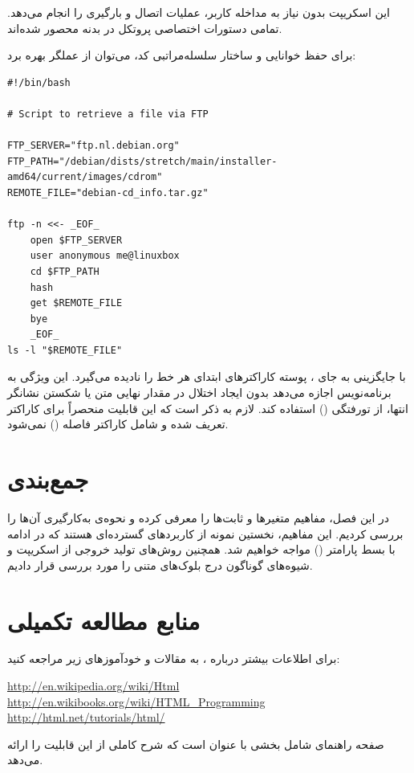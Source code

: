 این اسکریپت بدون نیاز به مداخله کاربر، عملیات اتصال و بارگیری را انجام می‌دهد. تمامی دستورات اختصاصی پروتکل  در بدنه  محصور شده‌اند.

برای حفظ خوانایی و ساختار سلسله‌مراتبی کد، می‌توان از عملگر \cmd{<<-} بهره برد:

\begin{latin}
\begin{lstlisting}
#!/bin/bash

# Script to retrieve a file via FTP

FTP_SERVER="ftp.nl.debian.org"
FTP_PATH="/debian/dists/stretch/main/installer-amd64/current/images/cdrom"
REMOTE_FILE="debian-cd_info.tar.gz"

ftp -n <<- _EOF_
    open $FTP_SERVER
    user anonymous me@linuxbox
    cd $FTP_PATH
    hash
    get $REMOTE_FILE
    bye
    _EOF_
ls -l "$REMOTE_FILE"
\end{lstlisting}
\end{latin}

با جایگزینی \cmd{<<-} به جای \cmd{<<}، پوسته کاراکترهای  ابتدای هر خط را نادیده می‌گیرد. این ویژگی به برنامه‌نویس اجازه می‌دهد بدون ایجاد اختلال در مقدار نهایی متن یا شکستن نشانگر انتها، از تورفتگی () استفاده کند. لازم به ذکر است که این قابلیت منحصراً برای کاراکتر  تعریف شده و شامل کاراکتر فاصله () نمی‌شود.

\section{جمع‌بندی}

در این فصل، مفاهیم متغیرها و ثابت‌ها را معرفی کرده و نحوه‌ی به‌کارگیری آن‌ها را بررسی کردیم. این مفاهیم، نخستین نمونه از کاربردهای گسترده‌ای هستند که در ادامه با بسط پارامتر () مواجه خواهیم شد. همچنین روش‌های تولید خروجی از اسکریپت و شیوه‌های گوناگون درج بلوک‌های متنی را مورد بررسی قرار دادیم.

\section{منابع مطالعه تکمیلی}

برای اطلاعات بیشتر درباره ، به مقالات و خودآموزهای زیر مراجعه کنید:

\begin{latin}
\url{http://en.wikipedia.org/wiki/Html}\\
\url{http://en.wikibooks.org/wiki/HTML_Programming}\\
\url{http://html.net/tutorials/html/}
\end{latin}

صفحه راهنمای  شامل بخشی با عنوان  است که شرح کاملی از این قابلیت را ارائه می‌دهد.
